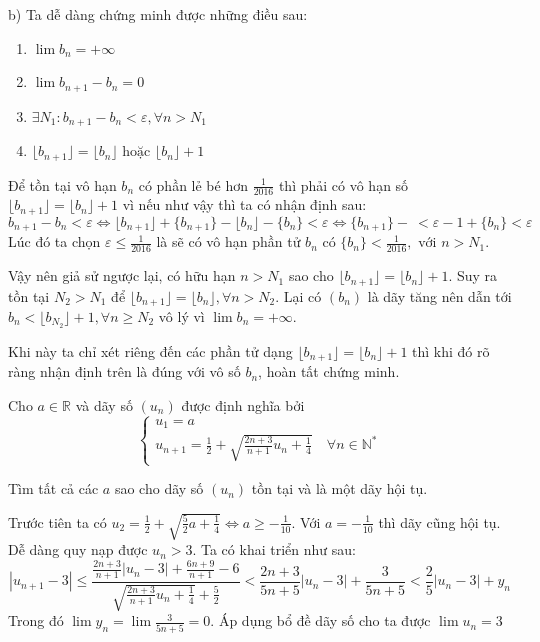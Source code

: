 \documentclass[11pt]{scrartcl}
\begin{document}
\begin{itemize}[label=, leftmargin=0em, itemsep=0.5em]
\begin{sol}
        b) Ta dễ dàng chứng minh được những điều sau:
        \begin{enumerate}
            \item $\lim b_n = +\infty$
            \item $\lim b_{n + 1} - b_n = 0$
            \item $\exists N_1: b_{n + 1} - b_{n} < \varepsilon, \forall n > N_1$
            \item $\lfloor b_{n + 1} \rfloor = \lfloor b_n \rfloor \text{ hoặc } \lfloor b_n \rfloor + 1$
        \end{enumerate}
        Để tồn tại vô hạn $b_n$ có phần lẻ bé hơn $\frac{1}{2016}$ thì phải có vô hạn số $\lfloor b_{n + 1} \rfloor =  \lfloor b_n \rfloor + 1$ vì nếu như vậy thì ta có nhận định sau: 
        \[ b_{n + 1} - b_{n} < \varepsilon \Leftrightarrow \lfloor b_{n + 1} \rfloor + \{b_{n + 1}\} - \lfloor b_n \rfloor- \{b_{n}\}  < \varepsilon \Leftrightarrow \{b_{n+1}\} - \ < \varepsilon - 1 + \{b_n\} < \varepsilon 
        \]
        Lúc đó ta chọn $\varepsilon \leq \frac{1}{2016}$ là sẽ có vô hạn phần tử $b_n$ có $\{b_n\} < \frac{1}{2016},  \text{ với } n > N_1$.

        Vậy nên giả sử ngược lại, có hữu hạn $n > N_1$ sao cho $\lfloor b_{n + 1} \rfloor =  \lfloor b_n \rfloor + 1$. Suy ra tồn tại $N_2 > N_1$ để $ \lfloor b_{n + 1} \rfloor =  \lfloor b_n \rfloor, \forall n > N_2$. Lại có $(b_n)$ là dãy tăng nên dẫn tới $b_n < \lfloor b_{N_2} \rfloor + 1, \forall n \geq N_2$ vô lý vì $\lim b_n = +\infty$.


        Khi này ta chỉ xét riêng đến các phần tử dạng $\lfloor b_{n + 1} \rfloor =  \lfloor b_n \rfloor + 1$ thì khi đó rõ ràng nhận định trên là đúng với vô số $b_n$, hoàn tất chứng minh.
        
        
    \end{sol}

    \begin{bt}
    	Cho $a\in\mathbb{R}$ và dãy số $(u_n)$ được định nghĩa bởi
\[ \begin{cases} u_1=a\\ u_{n+1}=\frac{1}{2}+\sqrt{\frac{2n+3}{n+1}u_n+\frac{1}{4}}\quad\forall n\in\mathbb{N}^* \end{cases} \]

 Tìm tất cả các $a$ sao cho dãy số $(u_n)$ tồn tại và là một dãy hội tụ.
    \end{bt}

    \begin{sol}
         Trước tiên ta có $u_2 = \frac{1}{2} + \sqrt{\frac{5}{2}a + \frac{1}{4}} \Leftrightarrow a \geq -\frac{1}{10}$. Với $a = -\frac{1}{10}$ thì dãy cũng hội tụ. Dễ dàng quy nạp được $u_n > 3$. Ta có khai triển như sau:
        \[
            |u_{n + 1} - 3| \leq \frac{\frac{2n + 3}{n + 1}|u_n- 3| + \frac{6n + 9}{n + 1} - 6}{\sqrt{\frac{2n + 3}{n + 1}u_n + \frac{1}{4}} + \frac{5}{2}} < \frac{2n + 3}{5n + 5}|u_n - 3| + \frac{3}{5n + 5} < \frac{2}{5}|u_n - 3| + y_n
        \]
        Trong đó $\lim y_n = \lim \frac{3}{5n + 5} = 0$. Áp dụng bổ đề dãy số cho ta được $\lim u_n = 3$



\end{sol}
\end{itemize}
\end{document}

